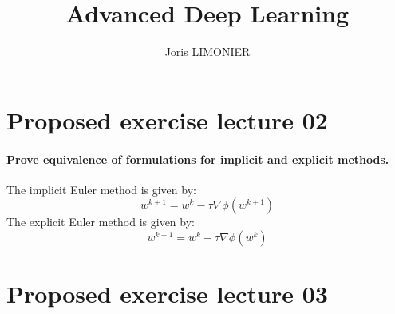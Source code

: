 \documentclass{article}
\title{Advanced Deep Learning}
\author{Joris LIMONIER}
\newcommand{\1}{\mathbf{1}}
\begin{document}
\maketitle

\tableofcontents

\section{Proposed exercise lecture 02}
\paragraph{Prove equivalence of formulations for implicit and explicit methods.}
The implicit Euler method is given by:
\begin{equation}
  w^{k+1} = w^{k} - \tau \nabla \phi (w^{k+1})
\end{equation}
The explicit Euler method is given by:
\begin{equation}
  w^{k+1} = w^{k} - \tau \nabla \phi (w^{k})
\end{equation}

\section{Proposed exercise lecture 03}
\end{document}
